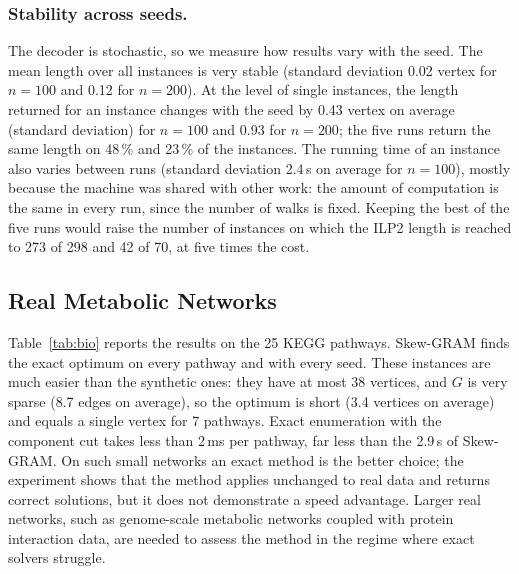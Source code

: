 \documentclass{llncs}
\begin{document}
\subsubsection{Stability across seeds.}
The decoder is stochastic, so we measure how results vary with the seed. The mean length over all instances is very stable (standard deviation 0.02 vertex for $n=100$ and 0.12 for $n=200$). At the level of single instances, the length returned for an instance changes with the seed by 0.43 vertex on average (standard deviation) for $n=100$ and 0.93 for $n=200$; the five runs return the same length on 48\,\% and 23\,\% of the instances. The running time of an instance also varies between runs (standard deviation 2.4\,s on average for $n=100$), mostly because the machine was shared with other work: the amount of computation is the same in every run, since the number of walks is fixed. Keeping the best of the five runs would raise the number of instances on which the ILP2 length is reached to 273 of 298 and 42 of 70, at five times the cost.

\subsection{Real Metabolic Networks}
\label{sec:bio}

Table~\ref{tab:bio} reports the results on the 25 KEGG pathways. Skew-GRAM finds the exact optimum on every pathway and with every seed. These instances are much easier than the synthetic ones: they have at most 38 vertices, and $G$ is very sparse (8.7 edges on average), so the optimum is short (3.4 vertices on average) and equals a single vertex for 7 pathways. Exact enumeration with the component cut takes less than 2\,ms per pathway, far less than the 2.9\,s of Skew-GRAM. On such small networks an exact method is the better choice; the experiment shows that the method applies unchanged to real data and returns correct solutions, but it does not demonstrate a speed advantage. Larger real networks, such as genome-scale metabolic networks coupled with protein interaction data, are needed to assess the method in the regime where exact solvers struggle.

\begin{table}[t]
\centering
\caption{Results on 25 KEGG metabolic pathways (five seeds each). LP$(D)$: number of vertices on a longest path of $D$. Optimum: exact optimum by enumeration. Hits: pathways on which Skew-GRAM reaches the optimum (mean over seeds). Lengths are means.}
\label{tab:bio}

\end{table}
\end{document}
